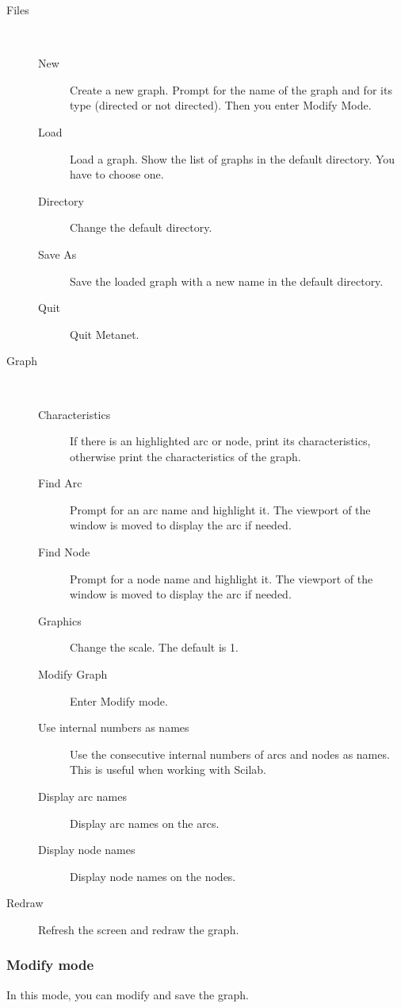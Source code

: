 \documentclass[11pt]{article}
\begin{document}
\begin{description}
\item[Files]\ 
\begin{description}
  \item[New] Create a new graph. Prompt for the name of the graph and
	for its type  (directed or not directed).
	Then you enter Modify Mode.
  \item[Load] Load a graph. Show the list of graphs in the default
	directory. You  have to choose one.
  \item[Directory] Change the default directory.
  \item[Save As] Save the loaded graph with a new name in the default 
	directory.
  \item[Quit] Quit Metanet.
\end{description}
\item[Graph]\ 
\begin{description}
  \item[Characteristics] If there is an highlighted arc or node, print its
	characteristics, otherwise print the characteristics 
	of the graph.
  \item[Find Arc] Prompt for an arc name and highlight it. The viewport of the
	window is moved to display the arc if needed.
  \item[Find Node] Prompt for a node name and highlight it. The viewport of the
	window is moved to display the arc if needed.
  \item[Graphics] Change the scale. The default is 1.
  \item[Modify Graph] Enter Modify mode.
  \item[Use internal numbers as names] Use the consecutive internal numbers of
	arcs and nodes as names. This is useful 
	when working with Scilab.
  \item[Display arc names] Display arc names on the arcs.
  \item[Display node names] Display node names on the nodes.
\end{description}
\item[Redraw] Refresh the screen and redraw the graph.
\end{description}

\subsubsection{Modify mode}

In this mode, you can modify and save the graph.
\end{document}
